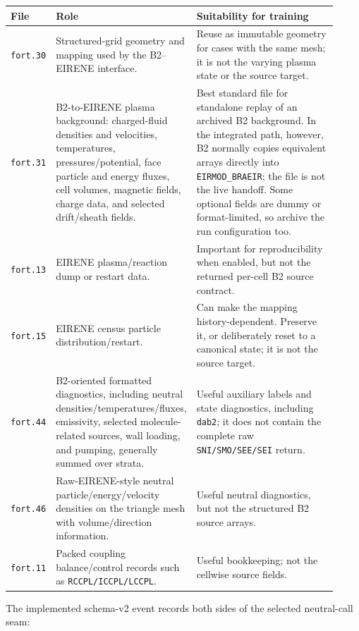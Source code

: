 \documentclass[11pt]{article}
\begin{document}
\begin{longtable}{@{}p{0.13\linewidth}p{0.35\linewidth}p{0.44\linewidth}@{}}
\toprule
File & Role & Suitability for training \\
\midrule
\endhead
\texttt{fort.30} & Structured-grid geometry and mapping used by the B2--EIRENE interface. & Reuse as immutable geometry for cases with the same mesh; it is not the varying plasma state or the source target. \\
\texttt{fort.31} & B2-to-EIRENE plasma background: charged-fluid densities and velocities, temperatures, pressures/potential, face particle and energy fluxes, cell volumes, magnetic fields, charge data, and selected drift/sheath fields. & Best standard file for standalone replay of an archived B2 background. In the integrated path, however, B2 normally copies equivalent arrays directly into \texttt{EIRMOD\_BRAEIR}; the file is not the live handoff. Some optional fields are dummy or format-limited, so archive the run configuration too. \\
\texttt{fort.13} & EIRENE plasma/reaction dump or restart data. & Important for reproducibility when enabled, but not the returned per-cell B2 source contract. \\
\texttt{fort.15} & EIRENE census particle distribution/restart. & Can make the mapping history-dependent. Preserve it, or deliberately reset to a canonical state; it is not the source target. \\
\texttt{fort.44} & B2-oriented formatted diagnostics, including neutral densities/temperatures/fluxes, emissivity, selected molecule-related sources, wall loading, and pumping, generally summed over strata. & Useful auxiliary labels and state diagnostics, including \texttt{dab2}; it does not contain the complete raw \texttt{SNI/SMO/SEE/SEI} return. \\
\texttt{fort.46} & Raw-EIRENE-style neutral particle/energy/velocity densities on the triangle mesh with volume/direction information. & Useful neutral diagnostics, but not the structured B2 source arrays. \\
\texttt{fort.11} & Packed coupling balance/control records such as \texttt{RCCPL/ICCPL/LCCPL}. & Useful bookkeeping; not the cellwise source fields. \\
\bottomrule
\end{longtable}

The implemented schema-v2 event records both sides of the selected neutral-call seam:
\end{document}
